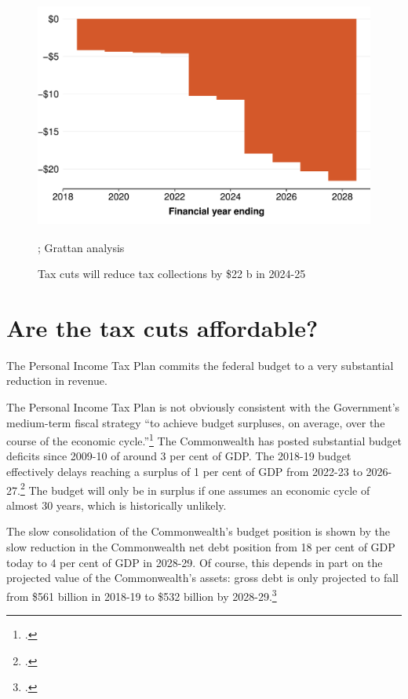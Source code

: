 \documentclass[submission]{grattan}\usepackage[]{graphicx}\usepackage[]{color}
\newenvironment{knitrout}{}{} %
\begin{document}
\begin{figure}
\caption{Tax cuts will reduce tax collections by \$22 b in 2024-25}\label{fig:1}
\begin{knitrout}
\color{fgcolor}
\includegraphics[width=4.47222in,height=2.92631723826715in]{atlas/fig1-1} 

\end{knitrout}


%
{\textcite{ATO2018}; Grattan analysis}
\end{figure}

\chapter{Are the tax cuts affordable? }\label{chap:are-the-tax-cuts-affordable}

The Personal Income Tax Plan commits the federal budget to a very substantial reduction in revenue.

The Personal Income Tax Plan is not obviously consistent with the Government's medium-term fiscal strategy ``to achieve budget surpluses, on average, over the course of the economic cycle.''\footcite[][3--7]{Treasury2018a}
The Commonwealth has posted substantial budget deficits since 2009-10 of around 3 per cent of GDP\@.
The 2018-19 budget effectively delays reaching a surplus of 1 per cent of GDP from 2022-23 to 2026-27.\footcite[][3--15]{Treasury2018a}
The budget will only be in surplus if one assumes an economic cycle of almost 30 years, which is historically unlikely.

The slow consolidation of the Commonwealth's budget position is shown by the slow reduction in the Commonwealth net debt position from 18 per cent of GDP today to 4 per cent of GDP in 2028-29. Of course, this depends in part on the projected value of the Commonwealth's assets: gross debt is only projected to fall from \$561 billion in 2018-19 to \$532 billion by 2028-29.\footcite[][3--16]{Treasury2018a}
\end{document}
